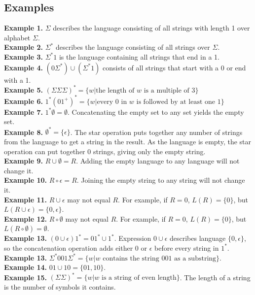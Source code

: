 \documentclass{article}
\begin{document}
\subsection{Examples}
\textbf{Example 1.} $\Sigma$ describes the language consisting of all strings with length 1 over alphabet $\Sigma$.\medskip
\\\textbf{Example 2.} $\Sigma^*$ describes the language consisting of all strings over $\Sigma$.\medskip
\\\textbf{Example 3.} $\Sigma^*1$ is the language containing all strings that end in a 1.\medskip
\\\textbf{Example 4.} $(0\Sigma^*) \cup (\Sigma^*1)$ consists of all strings that start with a 0 or end with a 1.\medskip
\\\textbf{Example 5.} $(\Sigma\Sigma\Sigma)^* = \{w | \text{the length of } w \text{ is a multiple of 3}\}$\medskip
\\\textbf{Example 6.} $1^*(01^+)^* = \{w |\text{every 0 in } w \text{ is followed by at least one 1}\}$\medskip
\\\textbf{Example 7.} $1^*\emptyset = \emptyset$. Concatenating the empty set to any set yields the empty set.\medskip
\\\textbf{Example 8.} $\emptyset^* = \{\epsilon\}$. The star operation puts together any number of strings from the language to get a string in the result. As the language is empty, the star operation can put together 0 strings, giving only the empty string.\medskip
\\\textbf{Example 9.} $R \cup \emptyset = R$. Adding the empty language to any language will not change it.\medskip
\\\textbf{Example 10.} $R \circ \epsilon = R$. Joining the empty string to any string will not change it.\medskip
\\\textbf{Example 11.} $R \cup \epsilon$ may not equal $R$. For example, if $R = 0$, $L(R) = \{0\}$, but $L(R \cup \epsilon) = \{0, \epsilon\}$.\medskip
\\\textbf{Example 12.} $R \circ \emptyset$ may not equal $R$. For example, if $R = 0$, $L(R) = \{0\}$, but $L(R \circ \emptyset) = \emptyset$.\medskip
\\\textbf{Example 13.} $(0 \cup \epsilon)1^* = 01^* \cup 1^*$. Expression $0 \cup \epsilon$ describes language $\{0, \epsilon\}$, so the concatenation operation adds either $0$ or $\epsilon$ before every string in $1^*$.\medskip
\\\textbf{Example 13.} $\Sigma^*001\Sigma^* = \{w | w \text{ contains the string } 001 \text{ as a substring}\}$.\medskip
\\\textbf{Example 14.} $01 \cup 10 = \{01, 10\}$.\medskip
\\\textbf{Example 15.} $(\Sigma\Sigma)^* = \{w|w \text{ is a string of even length}\}$. The length of a string is the number of symbols it contains.
\end{document}
